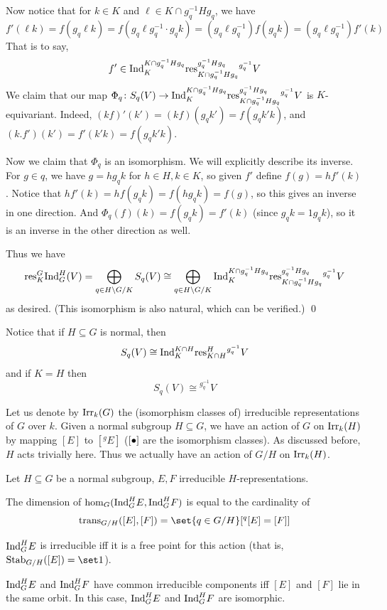     Now notice that for $k\in K$ and $\ell\in K\cap g_q^{-1}Hg_q$, we have
    $$ f'(\ell k) = f(g_q\ell k) = f(g_q\ell g_q^{-1}\cdot g_qk) = (g_q\ell g_q^{-1})f(g_qk) = (g_q\ell g_q^{-1})f'(k) $$
    That is to say,
    $$ f'\in{\rm Ind}^{K\cap g_q^{-1}Hg_q}_K{\rm res}^{g_q^{-1}Hg_q}_{K\cap g_q^{-1}Hg_q}{}^{g_q^{-1}}V $$
    We claim that our map $\Phi_q\colon S_q(V)\to{\rm Ind}^{K\cap g_q^{-1}Hg_q}_K{\rm res}^{g_q^{-1}Hg_q}_{K\cap g_q^{-1}Hg_q}{}^{g_q^{-1}}V$ is $K$-equivariant.
    Indeed, $(kf)'(k')=(kf)(g_qk')=f(g_qk'k)$, and $(k.f')(k')=f'(k'k)=f(g_qk'k)$.

    Now we claim that $\Phi_q$ is an isomorphism.
    We will explicitly describe its inverse.
    For $g\in q$, we have $g=hg_qk$ for $h\in H,k\in K$, so given $f'$ define $f(g)=hf'(k)$.
    Notice that $hf'(k)=hf(g_qk)=f(hg_qk)=f(g)$, so this gives an inverse in one direction.
    And $\Phi_q(f)(k)=f(g_qk)=f'(k)$ (since $g_qk=1g_qk$), so it is an inverse in the other direction as well.

    Thus we have
    $$ {\rm res}^G_K{\rm Ind}^H_G(V) = \bigoplus_{q\in H\setminus G/K}S_q(V) \cong \bigoplus_{q\in H\setminus G/K}{\rm Ind}^{K\cap g_q^{-1}Hg_q}_K{\rm res}^{g_q^{-1}Hg_q}_{K\cap g_q^{-1}Hg_q}{}^{g_q^{-1}}V $$
    as desired.
    (This isomorphism is also natural, which can be verified.)
    \qed

\eproof

Notice that if $H\subseteq G$ is normal, then
$$ S_q(V) \cong {\rm Ind}^{K\cap H}_K{\rm res}^H_{K\cap H}{}^{g_q^{-1}}V $$
and if $K=H$ then
$$ S_q(V) \cong {}^{g_q^{-1}}V $$

Let us denote by ${\rm Irr}_k(G)$ the (isomorphism classes of) irreducible representations of $G$ over $k$.
Given a normal subgroup $H\subseteq G$, we have an action of $G$ on ${\rm Irr}_k(H)$ by mapping $[E]$ to $[{}^gE]$ ($[\bullet]$ are the isomorphism classes).
As discussed before, $H$ acts trivially here.
Thus we actually have an action of $G/H$ on ${\rm Irr}_k(H)$.

\bprop

    Let $H\subseteq G$ be a normal subgroup, $E,F$ irreducible $H$-representations.
    \benum
        \item The dimension of $\hom_G({\rm Ind}^H_GE,{\rm Ind}^H_GF)$ is equal to the cardinality of
        $$ {\rm trans}_{G/H}([E],[F]) = \set{q\in G/H}[{{}^q[E]=[F]}] $$
        \item ${\rm Ind}^H_GE$ is irreducible iff it is a free point for this action (that is, $\stab_{G/H}([E])=\set1$).
        \item ${\rm Ind}^H_GE$ and ${\rm Ind}^H_GF$ have common irreducible components iff $[E]$ and $[F]$ lie in the same orbit.
        In this case, ${\rm Ind}^H_GE$ and ${\rm Ind}^H_GF$ are isomorphic.
    \eenum

